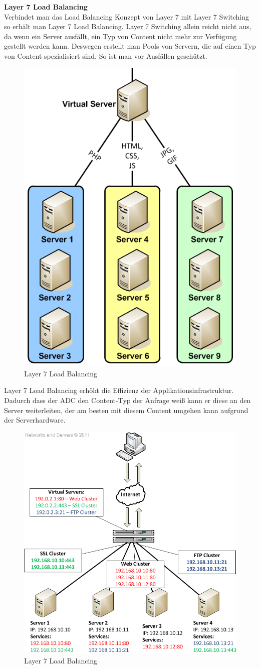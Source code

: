 \textbf{Layer 7 Load Balancing} \\
Verbindet man das Load Balancing Konzept von Layer 7 mit Layer 7 Switching so erhält man Layer 7 Load Balancing. Layer 7 Switching allein reicht nicht aus, da wenn ein Server ausfällt, ein Typ von Content nicht mehr zur Verfügung gestellt werden kann. Deswegen erstellt man Pools von Servern, die auf einen Typ von Content spezialisiert sind. So ist man vor Ausfällen geschützt. 
\pagebreak
\begin{figure}[!h]
	\begin{center}
		\includegraphics[width=0.3\linewidth]{images/loadbalancing6.jpg}
		\caption{Layer 7 Load Balancing \cite{LoadBalancing3}}
		\label{Layer 7 Load Balancing}
	\end{center}
\end{figure}

Layer 7 Load Balancing erhöht die Effizienz der Applikationsinfrastruktur. Dadurch dass der ADC den Content-Typ der Anfrage weiß kann er diese an den Server weiterleiten, der am besten mit diesem Content umgehen kann aufgrund der Serverhardware. \cite{LoadBalancing3}

\begin{figure}[!h]
	\begin{center}
		\includegraphics[width=0.55\linewidth]{images/loadbalancing7.jpg}
		\caption{Layer 7 Load Balancing \cite{LoadBalancing2}}
		\label{Layer 7 Load Balancing_2}
	\end{center}
\end{figure}

